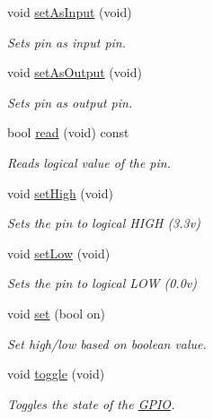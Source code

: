 {\bf }\par
\begin{DoxyCompactItemize}
\item 
void \hyperlink{classGPIO_a0e218bd5532bf7684b6e73d66cc959b9}{set\+As\+Input} (void)
\begin{DoxyCompactList}\small\item\em Sets pin as input pin. \end{DoxyCompactList}\item 
void \hyperlink{classGPIO_a436d72c6da1dab416d42ee2ed5a18b65}{set\+As\+Output} (void)
\begin{DoxyCompactList}\small\item\em Sets pin as output pin. \end{DoxyCompactList}\item 
bool \hyperlink{classGPIO_a3844a3dfa9e799262306c3dd9953ef88}{read} (void) const 
\begin{DoxyCompactList}\small\item\em Reads logical value of the pin. \end{DoxyCompactList}\item 
void \hyperlink{classGPIO_a99ad9887700c7abe1c551a3601db483a}{set\+High} (void)
\begin{DoxyCompactList}\small\item\em Sets the pin to logical H\+I\+GH (3.\+3v) \end{DoxyCompactList}\item 
void \hyperlink{classGPIO_a48509cf9b5e9d017c8da2fbaf17fa041}{set\+Low} (void)
\begin{DoxyCompactList}\small\item\em Sets the pin to logical L\+OW (0.\+0v) \end{DoxyCompactList}\item 
void \hyperlink{classGPIO_a97eb9da463a931cfda4667f8215f7e65}{set} (bool on)
\begin{DoxyCompactList}\small\item\em Set high/low based on boolean value. \end{DoxyCompactList}\item 
void \hyperlink{classGPIO_a299290d9266dffbe2747f8f1238be016}{toggle} (void)
\begin{DoxyCompactList}\small\item\em Toggles the state of the \hyperlink{classGPIO}{G\+P\+IO}. \end{DoxyCompactList}\end{DoxyCompactItemize}



